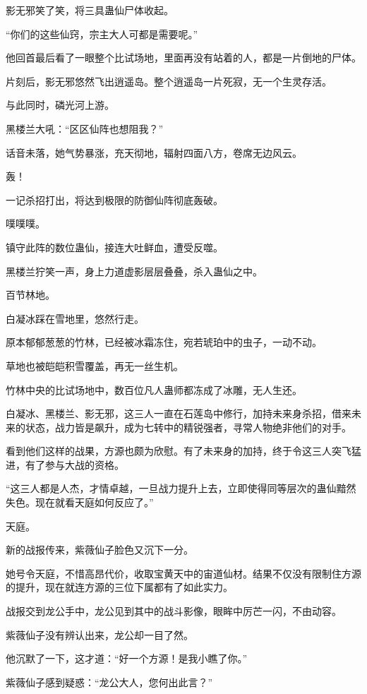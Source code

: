 \begin{this_body}
影无邪笑了笑，将三具蛊仙尸体收起。

“你们的这些仙窍，宗主大人可都是需要呢。”

他回首最后看了一眼整个比试场地，里面再没有站着的人，都是一片倒地的尸体。

片刻后，影无邪悠然飞出逍遥岛。整个逍遥岛一片死寂，无一个生灵存活。

与此同时，磷光河上游。

黑楼兰大吼：“区区仙阵也想阻我？”

话音未落，她气势暴涨，充天彻地，辐射四面八方，卷席无边风云。

轰！

一记杀招打出，将达到极限的防御仙阵彻底轰破。

噗噗噗。

镇守此阵的数位蛊仙，接连大吐鲜血，遭受反噬。

黑楼兰狞笑一声，身上力道虚影层层叠叠，杀入蛊仙之中。

百节林地。

白凝冰踩在雪地里，悠然行走。

原本郁郁葱葱的竹林，已经被冰霜冻住，宛若琥珀中的虫子，一动不动。

草地也被皑皑积雪覆盖，再无一丝生机。

竹林中央的比试场地中，数百位凡人蛊师都冻成了冰雕，无人生还。

白凝冰、黑楼兰、影无邪，这三人一直在石莲岛中修行，加持未来身杀招，借来未来的状态，战力皆是飙升，成为七转中的精锐强者，寻常人物绝非他们的对手。

看到他们这样的战果，方源也颇为欣慰。有了未来身的加持，终于令这三人突飞猛进，有了参与大战的资格。

“这三人都是人杰，才情卓越，一旦战力提升上去，立即使得同等层次的蛊仙黯然失色。现在就看天庭如何反应了。”

天庭。

新的战报传来，紫薇仙子脸色又沉下一分。

她号令天庭，不惜高昂代价，收取宝黄天中的宙道仙材。结果不仅没有限制住方源的提升，现在就连方源的三位下属都有了如此实力。

战报交到龙公手中，龙公见到其中的战斗影像，眼眸中厉芒一闪，不由动容。

紫薇仙子没有辨认出来，龙公却一目了然。

他沉默了一下，这才道：“好一个方源！是我小瞧了你。”

紫薇仙子感到疑惑：“龙公大人，您何出此言？”


\end{this_body}

